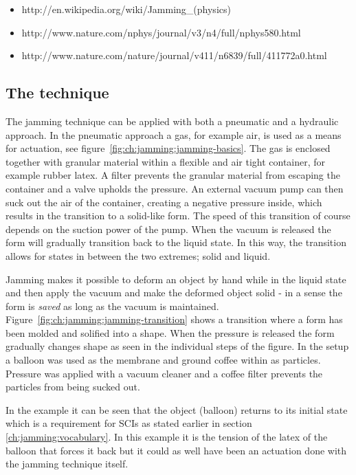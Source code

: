 
\begin{itemize}
	\item http://en.wikipedia.org/wiki/Jamming\_(physics)
	\item http://www.nature.com/nphys/journal/v3/n4/full/nphys580.html
	\item http://www.nature.com/nature/journal/v411/n6839/full/411772a0.html
\end{itemize}

\subsection{The technique}
\label{ch:jamming:technique}

The jamming technique can be applied with both a pneumatic and a hydraulic approach.
In the pneumatic approach a gas, for example air, is used as a means for actuation, see figure~\ref{fig:ch:jamming:jamming-basics}.
The gas is enclosed together with granular material within a flexible and air tight container, for example rubber latex. 
A filter prevents the granular material from escaping the container and a valve upholds the pressure.
An external vacuum pump can then suck out the air of the container, creating a negative pressure inside, which results in the transition to a solid-like form. 
The speed of this transition of course depends on the suction power of the pump.
When the vacuum is released the form will gradually transition back to the liquid state. 
In this way, the transition allows for states in between the two extremes; solid and liquid.

Jamming makes it possible to deform an object by hand while in the liquid state and then apply the vacuum and make the deformed object solid - in a sense the form is \emph{saved} as long as the vacuum is maintained.
Figure~\ref{fig:ch:jamming:jamming-transition} shows a transition where a form has been molded and solified into a shape.
When the pressure is released the form gradually changes shape as seen in the individual steps of the figure.
In the setup a balloon was used as the membrane and ground coffee within as particles.
Pressure was applied with a vacuum cleaner and a coffee filter prevents the particles from being sucked out.

In the example it can be seen that the object (balloon) returns to its initial state which is a requirement for SCIs as stated earlier in section \ref{ch:jamming:vocabulary}.
In this example it is the tension of the latex of the balloon that forces it back but it could as well have been an actuation done with the jamming technique itself. 

